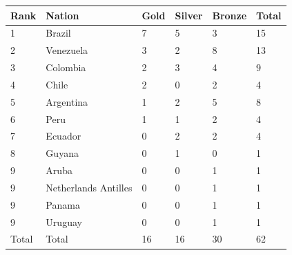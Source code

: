 \documentclass{article}
\begin{document}
\begin{tabular}{llllll}
\toprule
Rank & Nation & Gold & Silver & Bronze & Total \\
\midrule
1 & Brazil & 7 & 5 & 3 & 15 \\
2 & Venezuela & 3 & 2 & 8 & 13 \\
3 & Colombia & 2 & 3 & 4 & 9 \\
4 & Chile & 2 & 0 & 2 & 4 \\
5 & Argentina & 1 & 2 & 5 & 8 \\
6 & Peru & 1 & 1 & 2 & 4 \\
7 & Ecuador & 0 & 2 & 2 & 4 \\
8 & Guyana & 0 & 1 & 0 & 1 \\
9 & Aruba & 0 & 0 & 1 & 1 \\
9 & Netherlands Antilles & 0 & 0 & 1 & 1 \\
9 & Panama & 0 & 0 & 1 & 1 \\
9 & Uruguay & 0 & 0 & 1 & 1 \\
Total & Total & 16 & 16 & 30 & 62 \\
\bottomrule
\end{tabular}
\end{document}
